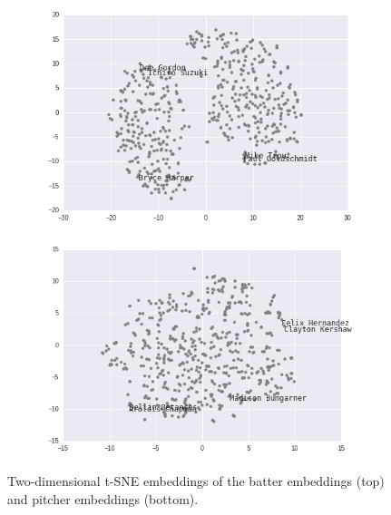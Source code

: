 \documentclass{article}
\begin{document}
\begin{figure}
\captionsetup[subfigure]{labelformat=empty}
\centering

    \begin{subfigure}[b]{0.75\textwidth}
    \includegraphics[width=1\linewidth]{batter_tsne.png}
    \caption{}
    \end{subfigure}

    \begin{subfigure}[b]{0.75\textwidth}
    \includegraphics[width=1\linewidth]{pitcher_tsne.png}
    \caption{}
    \end{subfigure}

\caption{Two-dimensional t-SNE embeddings of the batter embeddings (top) and pitcher embeddings (bottom).}
\label{fig:tsne}
\end{figure}
\end{document}
